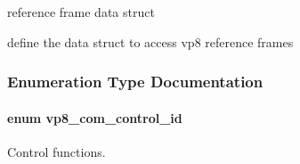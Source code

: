 reference frame data struct 

define the data struct to access vp8 reference frames 

\subsubsection{Enumeration Type Documentation}
\hypertarget{group__vp8_ga8cadbc8e0af3da96ef7a2dbd4ed06599}{
\paragraph[{vp8\-\_\-com\-\_\-control\-\_\-id}]{\setlength{\rightskip}{0pt plus 5cm}enum {\bf vp8\-\_\-com\-\_\-control\-\_\-id}}}\label{group__vp8_ga8cadbc8e0af3da96ef7a2dbd4ed06599}


Control functions. 


